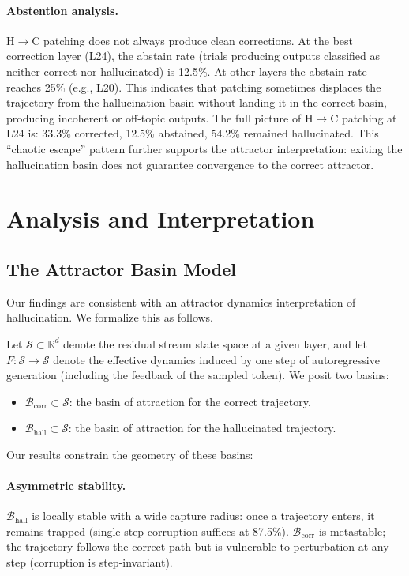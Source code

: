 \documentclass[11pt,a4paper]{article}
\begin{document}
\paragraph{Abstention analysis.} H$\to$C patching does not always produce clean corrections. At the best correction layer (L24), the abstain rate (trials producing outputs classified as neither correct nor hallucinated) is 12.5\%. At other layers the abstain rate reaches 25\% (e.g., L20). This indicates that patching sometimes displaces the trajectory from the hallucination basin without landing it in the correct basin, producing incoherent or off-topic outputs. The full picture of H$\to$C patching at L24 is: 33.3\% corrected, 12.5\% abstained, 54.2\% remained hallucinated. This ``chaotic escape'' pattern further supports the attractor interpretation: exiting the hallucination basin does not guarantee convergence to the correct attractor.

\section{Analysis and Interpretation}

\subsection{The Attractor Basin Model}

Our findings are consistent with an attractor dynamics interpretation of hallucination. We formalize this as follows.

Let $\mathcal{S} \subset \mathbb{R}^d$ denote the residual stream state space at a given layer, and let $F: \mathcal{S} \to \mathcal{S}$ denote the effective dynamics induced by one step of autoregressive generation (including the feedback of the sampled token). We posit two basins:

\begin{itemize}
    \item $\mathcal{B}_\text{corr} \subset \mathcal{S}$: the basin of attraction for the correct trajectory.
    \item $\mathcal{B}_\text{hall} \subset \mathcal{S}$: the basin of attraction for the hallucinated trajectory.
\end{itemize}

Our results constrain the geometry of these basins:

\paragraph{Asymmetric stability.} $\mathcal{B}_\text{hall}$ is locally stable with a wide capture radius: once a trajectory enters, it remains trapped (single-step corruption suffices at 87.5\%). $\mathcal{B}_\text{corr}$ is metastable; the trajectory follows the correct path but is vulnerable to perturbation at any step (corruption is step-invariant).
\end{document}
